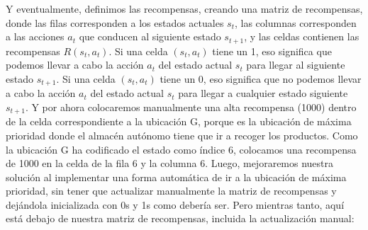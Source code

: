\documentclass[
]{book}
\begin{document}
Y eventualmente, definimos las recompensas, creando una matriz de recompensas, donde las filas corresponden a los estados actuales \(s_t\), las columnas corresponden a las acciones \(a_t\) que conducen al siguiente estado \(s_{t + 1}\), y las celdas contienen las recompensas \(R(s_t, a_t)\). Si una celda \((s_t, a_t)\) tiene un 1, eso significa que podemos llevar a cabo la acción \(a_t\) del estado actual \(s_t\) para llegar al siguiente estado \(s_{t + 1}\). Si una celda \((s_t, a_t)\) tiene un 0, eso significa que no podemos llevar a cabo la acción \(a_t\) del estado actual \(s_t\) para llegar a cualquier estado siguiente \(s_{t + 1}\). Y por ahora colocaremos manualmente una alta recompensa (1000) dentro de la celda correspondiente a la ubicación G, porque es la ubicación de máxima prioridad donde el almacén autónomo tiene que ir a recoger los productos. Como la ubicación G ha codificado el estado como índice 6, colocamos una recompensa de 1000 en la celda de la fila 6 y la columna 6. Luego, mejoraremos nuestra solución al implementar una forma automática de ir a la ubicación de máxima prioridad, sin tener que actualizar manualmente la matriz de recompensas y dejándola inicializada con 0s y 1s como debería ser. Pero mientras tanto, aquí está debajo de nuestra matriz de recompensas, incluida la actualización manual:
\end{document}
